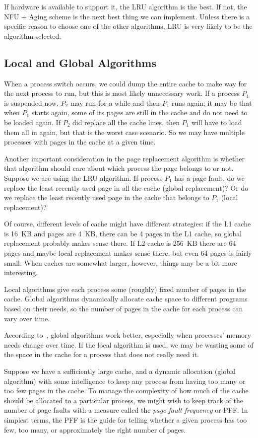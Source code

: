 If hardware is available to support it, the LRU algorithm is the best. If not, the NFU + Aging scheme is the next best thing we can implement. Unless there is a specific reason to choose one of the other algorithms, LRU is very likely to be the algorithm selected.

\subsection*{Local and Global Algorithms}
When a process switch occurs, we could dump the entire cache to make way for the next process to run, but this is most likely unnecessary work. If a process $P_{1}$ is suspended now, $P_{2}$ may run for a while and then $P_{1}$ runs again; it may be that when $P_{1}$ starts again, some of its pages are still in the cache and do not need to be loaded again. If $P_{2}$ did replace all the cache lines, then $P_{1}$ will have to load them all in again, but that is the worst case scenario. So we may have multiple processes with pages in the cache at a given time.

Another important consideration in the page replacement algorithm is whether that algorithm should care about which process the page belongs to or not. Suppose we are using the LRU algorithm. If process $P_{1}$ has a page fault, do we replace the least recently used page in all the cache (global replacement)? Or do we replace the least recently used page in the cache that belongs to $P_{1}$ (local replacement)?

Of course, different levels of cache might have different strategies: if the L1 cache is 16~KB and pages are 4~KB, there can be 4 pages in the L1 cache, so global replacement probably makes sense there. If L2 cache is 256~KB there are 64 pages and maybe local replacement makes sense there, but even 64 pages is fairly small. When caches are somewhat larger, however, things may be a bit more interesting.

Local algorithms give each process some (roughly) fixed number of pages in the cache. Global algorithms dynamically allocate cache space to different programs based on their needs, so the number of pages in the cache for each process can vary over time. 

According to~\cite{mos}, global algorithms work better, especially when processes' memory needs change over time. If the local algorithm is used, we may be wasting some of the space in the cache for a process that does not really need it. 

Suppose we have a sufficiently large cache, and a dynamic allocation (global algorithm) with some intelligence to keep any process from having too many or too few pages in the cache. To manage the complexity of how much of the cache should be allocated to a particular process, we might wish to keep track of the number of page faults with a measure called the \textit{page fault frequency} or PFF. In simplest terms, the PFF is the guide for telling whether a given process has too few, too many, or approximately the right number of pages. 

